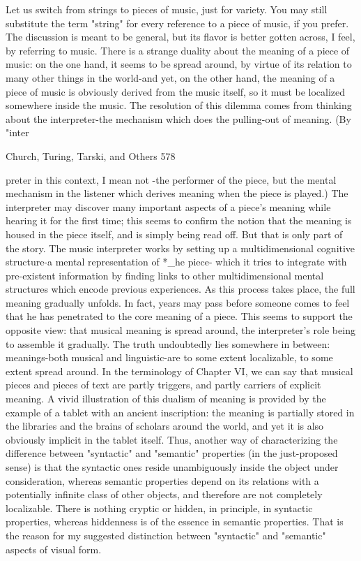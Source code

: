 {       Let us switch from strings to pieces of music, just for variety. You may still
       substitute the term "string" for every reference to a piece of music, if you prefer.
       The discussion is meant to be general, but its flavor is better gotten across, I feel,
       by referring to music. There is a strange duality about the meaning of a piece of
       music: on the one hand, it seems to be spread around, by virtue of its relation to
       many other things in the world-and yet, on the other hand, the meaning of a piece
       of music is obviously derived from the music itself, so it must be localized
       somewhere inside the music.
       The resolution of this dilemma comes from thinking about the interpreter-the
       mechanism which does the pulling-out of meaning. (By "inter




Church, Turing, Tarski, and Others                                                       578

preter in this context, I mean not -the performer of the piece, but the mental mechanism
in the listener which derives meaning when the piece is played.) The interpreter may
discover many important aspects of a piece's meaning while hearing it for the first time;
this seems to confirm the notion that the meaning is housed in the piece itself, and is
simply being read off. But that is only part of the story. The music interpreter works by
setting up a multidimensional cognitive structure-a mental representation of *\_he piece-
which it tries to integrate with pre-existent information by finding links to other
multidimensional mental structures which encode previous experiences. As this process
takes place, the full meaning gradually unfolds. In fact, years may pass before someone
comes to feel that he has penetrated to the core meaning of a piece. This seems to support
the opposite view: that musical meaning is spread around, the interpreter's role being to
assemble it gradually.
         The truth undoubtedly lies somewhere in between: meanings-both musical and
linguistic-are to some extent localizable, to some extent spread around. In the
terminology of Chapter VI, we can say that musical pieces and pieces of text are partly
triggers, and partly carriers of explicit meaning. A vivid illustration of this dualism of
meaning is provided by the example of a tablet with an ancient inscription: the meaning
is partially stored in the libraries and the brains of scholars around the world, and yet it is
also obviously implicit in the tablet itself.
         Thus, another way of characterizing the difference between "syntactic" and
"semantic" properties (in the just-proposed sense) is that the syntactic ones reside
unambiguously inside the object under consideration, whereas semantic properties
depend on its relations with a potentially infinite class of other objects, and therefore are
not completely localizable. There is nothing cryptic or hidden, in principle, in syntactic
properties, whereas hiddenness is of the essence in semantic properties. That is the reason
for my suggested distinction between "syntactic" and "semantic" aspects of visual form.

}
